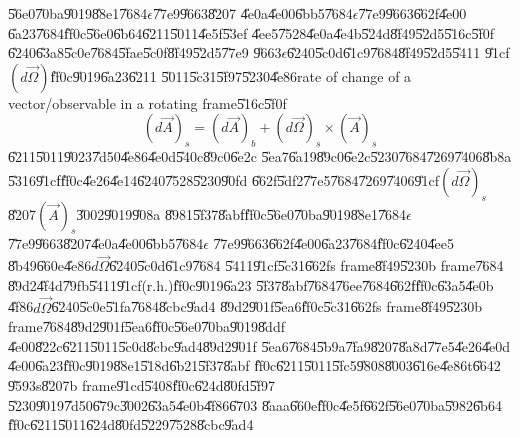 \documentclass[12pt,a4paper]{article}
\begin{document}
\U{56e0}\U{70ba}\U{9019}\U{88e1}\U{7684}$\epsilon $\U{77e9}\U{9663}\U{8207}%
\U{4e0a}\U{4e00}\U{6bb5}\U{7684}$\epsilon $\U{77e9}\U{9663}\U{662f}\U{4e00}%
\U{6a23}\U{7684}\U{ff0c}\U{56e0}\U{6b64}\U{6211}\U{5011}\U{4e5f}\U{53ef}%
\U{4ee5}\U{7528}\U{4e0a}\U{4e4b}\U{524d}\U{8f49}\U{52d5}\U{516c}\U{5f0f}%
\U{6240}\U{63a8}\U{5c0e}\U{7684}\U{5fae}\U{5c0f}\U{8f49}\U{52d5}\U{77e9}%
\U{9663}$\epsilon $\U{6240}\U{5c0d}\U{61c9}\U{7684}\U{8f49}\U{52d5}\U{5411}%
\U{91cf}$\left( d\vec{\Omega}\right) $\U{ff0c}\U{9019}\U{6a23}\U{6211}%
\U{5011}\U{5c31}\U{5f97}\U{5230}\U{4e86}rate of change of a
vector/observable in a rotating frame\U{516c}\U{5f0f}%
\begin{equation}
\left( d\vec{A}\right) _{s}=\left( d\vec{A}\right) _{b}+\left( d\vec{\Omega}%
\right) _{s}\times \left( \vec{A}\right) _{s}  \label{rateofdomega}
\end{equation}%
\U{6211}\U{5011}\U{9023}\U{7d50}\U{4e86}\U{4e0d}\U{540c}\U{89c0}\U{6e2c}%
\U{5ea7}\U{6a19}\U{89c0}\U{6e2c}\U{5230}\U{7684}\U{7269}\U{7406}\U{8b8a}%
\U{5316}\U{91cf}\U{ff0c}\U{4e26}\U{4e14}\U{6240}\U{7528}\U{5230}\U{90fd}%
\U{662f}\U{5df2}\U{77e5}\U{7684}\U{7269}\U{7406}\U{91cf}$\left( d\vec{\Omega}%
\right) _{s}$\U{8207}$\left( \vec{A}\right) _{s}$\U{3002}\U{9019}\U{908a}%
\U{8981}\U{5f37}\U{8abf}\U{ff0c}\U{56e0}\U{70ba}\U{9019}\U{88e1}\U{7684}$%
\epsilon $\U{77e9}\U{9663}\U{8207}\U{4e0a}\U{4e00}\U{6bb5}\U{7684}$\epsilon $%
\U{77e9}\U{9663}\U{662f}\U{4e00}\U{6a23}\U{7684}\U{ff0c}\U{6240}\U{4ee5}%
\U{8b49}\U{660e}\U{4e86}$d\vec{\Omega}$\U{6240}\U{5c0d}\U{61c9}\U{7684}%
\U{5411}\U{91cf}\U{5c31}\U{662f}s frame\U{8f49}\U{5230}b frame\U{7684}%
\U{89d2}\U{4f4d}\U{79fb}\U{5411}\U{91cf}(r.h.)\U{ff0c}\U{9019}\U{6a23}%
\U{5f37}\U{8abf}\U{7684}\U{76ee}\U{7684}\U{662f}\U{ff0c}\U{63a5}\U{4e0b}%
\U{4f86}$d\vec{\Omega}$\U{6240}\U{5c0e}\U{51fa}\U{7684}\U{8cbc}\U{9ad4}%
\U{89d2}\U{901f}\U{5ea6}\U{ff0c}\U{5c31}\U{662f}s frame\U{8f49}\U{5230}b
frame\U{7684}\U{89d2}\U{901f}\U{5ea6}\U{ff0c}\U{56e0}\U{70ba}\U{9019}\U{8ddf}%
\U{4e00}\U{822c}\U{6211}\U{5011}\U{5c0d}\U{8cbc}\U{9ad4}\U{89d2}\U{901f}%
\U{5ea6}\U{7684}\U{5b9a}\U{7fa9}\U{8207}\U{8a8d}\U{77e5}\U{4e26}\U{4e0d}%
\U{4e00}\U{6a23}\U{ff0c}\U{9019}\U{88e1}\U{518d}\U{6b21}\U{5f37}\U{8abf}%
\U{ff0c}\U{6211}\U{5011}\U{5fc5}\U{9808}\U{8003}\U{616e}\U{4e86}t\U{6642}%
\U{9593}s\U{8207}b frame\U{91cd}\U{5408}\U{ff0c}\U{624d}\U{80fd}\U{5f97}%
\U{5230}\U{9019}\U{7d50}\U{679c}\U{3002}\U{63a5}\U{4e0b}\U{4f86}\U{6703}%
\U{8aaa}\U{660e}\U{ff0c}\U{4e5f}\U{662f}\U{56e0}\U{70ba}\U{5982}\U{6b64}%
\U{ff0c}\U{6211}\U{5011}\U{624d}\U{80fd}\U{5229}\U{7528}\U{8cbc}\U{9ad4}%
\end{document}
